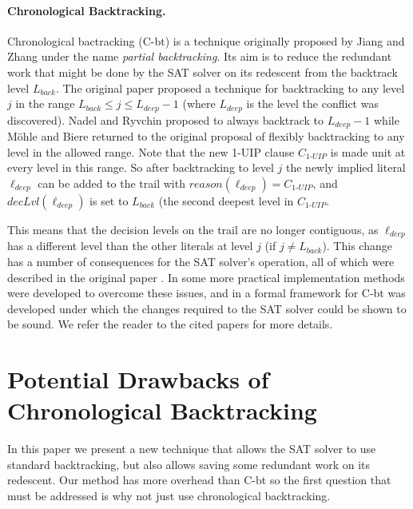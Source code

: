 \documentclass[runningheads]{llncs}
\newcommand{\sat}{SAT\xspace}
\newcommand{\dlevel}[1]{\ensuremath{\mathit{decLvl}(#1)}}
\newcommand{\reason}[1]{\ensuremath{\mathit{reason}(#1)}}
\newcommand{\uipcls}{C_{\textit{1-UIP}}}
\newcommand{\deepestLvl}{L_{\textit{deep}}}
\newcommand{\deepestLit}{\ell_{\textit{deep}}}
\newcommand{\btL}{L_{\textit{back}}}
\newcommand{\cbt}{C-bt\xspace}
\begin{document}
\paragraph{Chronological Backtracking.}
Chronological bactracking (\cbt) is a technique originally proposed by
Jiang and Zhang \cite{DBLP:conf/lpar/JiangZ13} under the name
\textit{partial backtracking}. Its aim is to reduce the redundant work
that might be done by the \sat solver on its redescent from the
backtrack level $\btL$. The original paper proposed a technique for
backtracking to any level $j$ in the range
$\btL \leq j \leq \deepestLvl{-}1$ (where $\deepestLvl$ is the level
the conflict was discovered). Nadel and Ryvchin
\cite{DBLP:conf/sat/NadelR18} proposed to always backtrack to
$\deepestLvl{-}1$ while M{\"{o}}hle and Biere
\cite{DBLP:conf/sat/MohleB19} returned to the original proposal of
flexibly backtracking to any level in the allowed range. Note that the
new 1-UIP clause $\uipcls$ is made unit at every level in this
range. So after backtracking to level $j$ the newly implied literal
$\deepestLit$ can be added to the trail with
$\reason{\deepestLit}=\uipcls$, and $\dlevel{\deepestLit}$ is set to
$\btL$ (the second deepest level in $\uipcls$.

This means that the decision levels on the trail are no longer
contiguous, as $\deepestLit$ has a different level than the other
literals at level $j$ (if $j\neq \btL$). This change has a number of
consequences for the \sat solver's operation, all of which were
described in the original paper \cite{DBLP:conf/lpar/JiangZ13}. In
\cite{DBLP:conf/sat/NadelR18} some more practical implementation
methods were developed to overcome these issues, and in
\cite{DBLP:conf/sat/MohleB19} a formal framework for \cbt was
developed under which the changes required to the \sat solver could be
shown to be sound. We refer the reader to the cited papers for
more details.

\section{Potential Drawbacks of Chronological Backtracking}
In this paper we present a new technique that allows the \sat solver
to use standard backtracking, but also allows saving some redundant
work on its redescent.  Our method has more overhead than \cbt so the
first question that must be addressed is why not just use
chronological backtracking.
\end{document}
